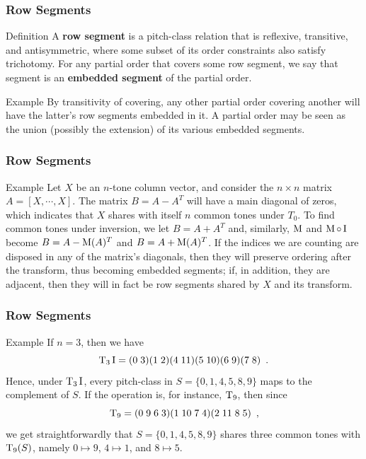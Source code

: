 \begin{frame}
	\frametitle{Row Segments}
	\begin{block}{Definition}
		A \textbf{row segment} is a pitch-class relation that is reflexive, transitive, and antisymmetric, where some subset of its order constraints also satisfy trichotomy. For any partial order that covers some row segment, we say that segment is an \textbf{embedded segment} of the partial order.
	\end{block}
	\begin{block}{Example}
		By transitivity of covering, any other partial order covering another will have the latter's row segments embedded in it. A partial order may be seen as the union (possibly the extension) of its various embedded segments.
	\end{block}
\end{frame}

\begin{frame}
	\frametitle{Row Segments}
	\begin{block}{Example}
		Let $X$ be an $n$-tone column vector, and consider the $n \times n$ matrix $A = [X, \cdots, X]$. The matrix $B = A - A^T$ will have a main diagonal of zeros, which indicates that $X$ shares with itself $n$ common tones under $T_0$. To find common tones under inversion, we let $B = A + A^T$ and, similarly, $\operatorname{M}$ and $\operatorname{M} \circ \operatorname{I}$ become $B = A - \operatorname{M}(A)^T$ and $B = A + \operatorname{M}(A)^T$. If the indices we are counting are disposed in any of the matrix's diagonals, then they will preserve ordering after the transform, thus becoming embedded segments; if, in addition, they are adjacent, then they will in fact be row segments shared by $X$ and its transform.
	\end{block}
\end{frame}

\begin{frame}
	\frametitle{Row Segments}
	\begin{block}{Example}
		If $n = 3$, then we have
		\begin{equation*}
			\operatorname{T}_3\operatorname{I} = (0 \; 3) (1 \; 2) (4 \; 11) (5 \; 10) (6 \; 9) (7 \; 8) \enspace.
		\end{equation*}
		Hence, under $\operatorname{T}_3\operatorname{I}$, every pitch-class in $S = \{ 0, 1, 4, 5, 8, 9 \}$ maps to the complement of $S$. If the operation is, for instance, $\operatorname{T}_9$, then since
		\begin{equation*}
			\operatorname{T}_9 = (0 \; 9 \; 6 \; 3) (1 \; 10 \; 7 \; 4) (2 \; 11 \; 8 \; 5) \enspace,
		\end{equation*}
		we get straightforwardly that $S = \{ 0, 1, 4, 5, 8, 9 \}$ shares three common tones with $\operatorname{T}_9(S)$, namely $0 \mapsto 9$, $4 \mapsto 1$, and $8 \mapsto 5$.
	\end{block}
\end{frame}


